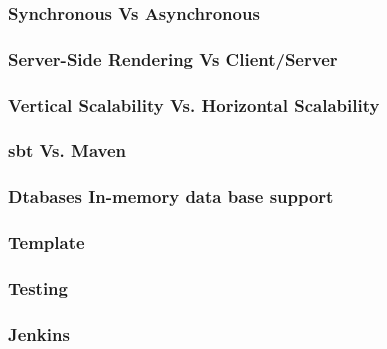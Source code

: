 \subsubsection{Synchronous Vs Asynchronous}
\subsubsection{Server-Side Rendering Vs Client/Server}
\subsubsection{Vertical Scalability Vs. Horizontal Scalability}
\subsubsection{sbt Vs. Maven}
\subsubsection{Dtabases In-memory data base support}
\subsubsection{Template}
\subsubsection{Testing}
\subsubsection{Jenkins}



